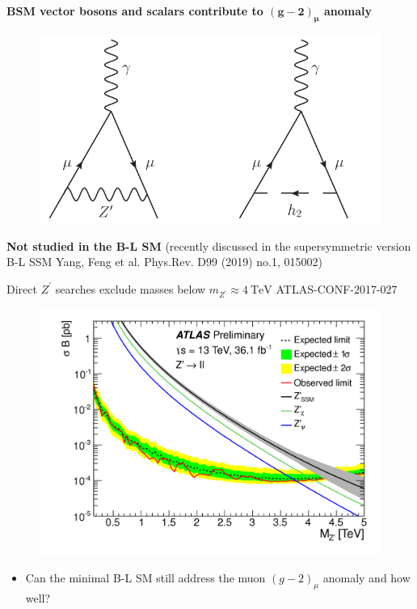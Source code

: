 \documentclass[10pt,xcolor=dvipsnames,mathserif]{beamer}
\renewcommand{\(}{\left(}
\renewcommand{\)}{\right)}
\renewcommand{\[}{\left[}
\renewcommand{\]}{\right]}
\newcommand{\blue}[0]{\color{blue}}
\newcommand{\red}[0]{\color{red}}
\begin{document}
\begin{frame}
	
			\begin{exampleblock}{}
				{\bf BSM vector bosons and scalars
					 contribute to $\bm{\(g-2\)_\mu}$ anomaly }
			\end{exampleblock} 
		\begin{figure}[!h]
			\includegraphics[scale=0.6]{g-2.pdf}
		\end{figure}	
		{\bf \red Not studied in the B-L SM} (recently discussed in the supersymmetric version B-L SSM {\scriptsize \blue Yang, Feng et al. Phys.Rev. D99 (2019) no.1, 015002})

\end{frame}

\begin{frame}
	Direct $Z^\prime$ searches exclude masses below $m_{Z^\prime} \approx 4~\mathrm{TeV}$ {\scriptsize \blue ATLAS-CONF-2017-027} 
		\begin{figure}[!h]
			\includegraphics[scale=0.12
			]{fig_04.png}
		\end{figure}	
		
\begin{itemize}
	\item Can the minimal B-L SM still address the muon $\(g-2\)_\mu$ anomaly and how well? 
\end{itemize}		
		
\end{frame}
\end{document}
